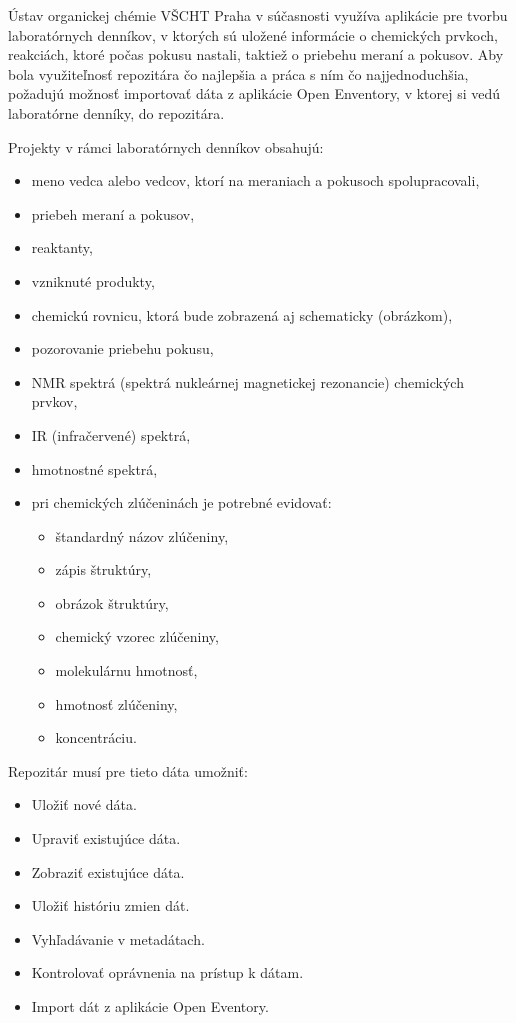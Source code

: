\documentclass[thesis=M,slovak]{FITthesis}[2013/05/06]
\begin{document}
Ústav organickej chémie VŠCHT Praha v súčasnosti využíva aplikácie pre tvorbu laboratórnych denníkov, v ktorých sú uložené informácie o chemických prvkoch, reakciách, ktoré počas pokusu nastali, taktiež o priebehu meraní a pokusov. Aby bola využiteľnosť repozitára čo najlepšia a práca s ním čo najjednoduchšia, požadujú možnosť importovať dáta z aplikácie Open Enventory, v ktorej si vedú laboratórne denníky, do repozitára. 

Projekty v rámci laboratórnych denníkov obsahujú: 
		\begin{itemize}
			\item meno vedca alebo vedcov, ktorí na meraniach a pokusoch spolupracovali,
			\item priebeh meraní a pokusov,
			\item reaktanty,
			\item vzniknuté produkty,
			\item chemickú rovnicu, ktorá bude zobrazená aj schematicky (obrázkom),
			\item pozorovanie priebehu pokusu,
			\item NMR spektrá (spektrá nukleárnej magnetickej rezonancie) chemických prvkov,
			\item IR (infračervené) spektrá,
			\item hmotnostné spektrá,
			\item pri chemických zlúčeninách je potrebné evidovať:
				\begin{itemize}
					\item štandardný názov zlúčeniny,
					\item zápis štruktúry,
					\item obrázok štruktúry,
					\item chemický vzorec zlúčeniny,
					\item molekulárnu hmotnosť,
					\item hmotnosť zlúčeniny,
					\item koncentráciu.
				\end{itemize}
		\end{itemize}

Repozitár musí pre tieto dáta umožniť:
\begin{itemize}
	\item Uložiť nové dáta.
	\item Upraviť existujúce dáta.
	\item Zobraziť existujúce dáta.
	\item Uložiť históriu zmien dát.
	\item Vyhľadávanie v metadátach.
	\item Kontrolovať oprávnenia na prístup k dátam.
	\item Import dát z aplikácie Open Eventory.
\end{itemize}
\end{document}

